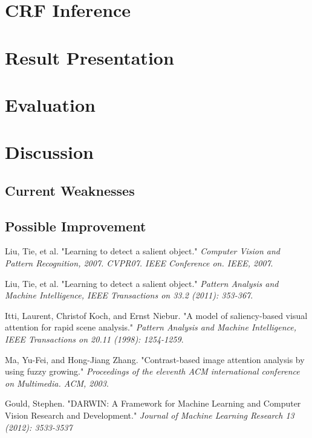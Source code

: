 \documentclass[10pt,twocolumn,letterpaper]{article}
\begin{document}
\section{CRF Inference}

\section{Result Presentation}

\section{Evaluation}

\section{Discussion}
\subsection{Current Weaknesses}
\subsection{Possible Improvement}

\begin{thebibliography}{99} \fontsize{9pt}{50} \setlength{\itemsep}{-0.5pt} 
     Liu, Tie, et al. "Learning to detect a salient object." 
        \textit{Computer Vision and Pattern Recognition, 2007. CVPR07. IEEE Conference on. IEEE, 2007}.

     Liu, Tie, et al. "Learning to detect a salient object." 
        \textit{Pattern Analysis and Machine Intelligence, IEEE Transactions on 33.2 (2011): 353-367}. 

     Itti, Laurent, Christof Koch, and Ernst Niebur. "A model of saliency-based visual attention for rapid scene analysis."
        \textit{Pattern Analysis and Machine Intelligence, IEEE Transactions on 20.11 (1998): 1254-1259}.

     Ma, Yu-Fei, and Hong-Jiang Zhang. "Contrast-based image attention analysis by using fuzzy growing."
        \textit{ Proceedings of the eleventh ACM international conference on Multimedia. ACM, 2003}. 

     Gould, Stephen. "DARWIN: A Framework for Machine Learning and Computer Vision Research and Development." 
        \textit{Journal of Machine Learning Research 13 (2012): 3533-3537}

\end{thebibliography}
\end{document}
